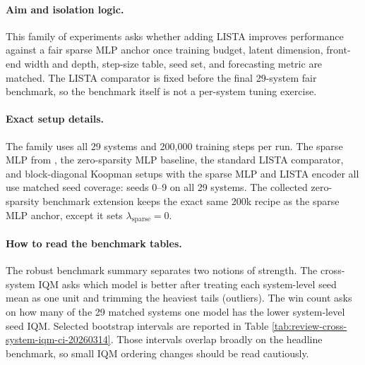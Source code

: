 \paragraph{Aim and isolation logic.}
This family of experiments asks whether adding LISTA improves performance against a fair
sparse MLP anchor once training budget, latent dimension, front-end width and
depth, step-size table, seed set, and forecasting metric are matched. The
LISTA comparator is fixed before the final 29-system fair benchmark, so the
benchmark itself is not a per-system tuning exercise. 

\paragraph{Exact setup details.}
The family uses all 29 systems and 200,000 training steps per run. The sparse
MLP from \citet{fathi_course_2023}, the zero-sparsity MLP baseline, the standard LISTA comparator, and block-diagonal Koopman setups with the sparse MLP and LISTA encoder all
use matched seed coverage: seeds 0--9 on all 29 systems.
The collected
zero-sparsity benchmark extension keeps the exact same 200k recipe as the
sparse MLP anchor, except it sets $\lambda_{\mathrm{sparse}} = 0$. 

\paragraph{How to read the benchmark tables.}
The robust benchmark summary separates two notions of strength. The
cross-system IQM asks which model is better after treating each system-level
seed mean as one unit and trimming the heaviest tails (outliers). The win count asks on
how many of the 29 matched systems one model has the lower system-level seed
IQM. 
Selected bootstrap
intervals are reported in Table \ref{tab:review-cross-system-iqm-ci-20260314}.
Those intervals overlap broadly on the headline benchmark, so small IQM ordering changes should be read cautiously.

